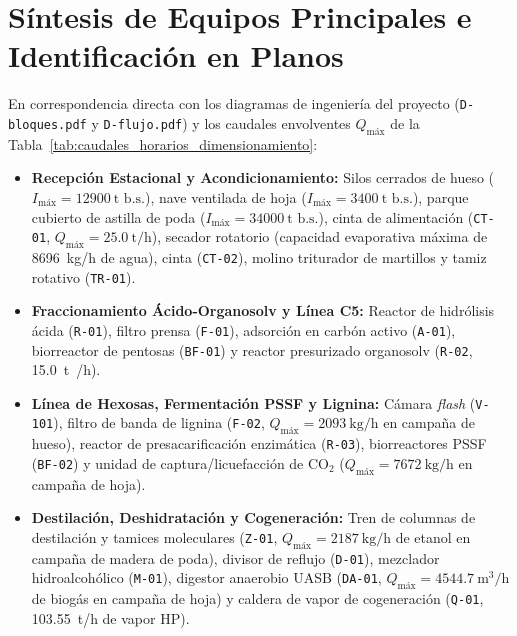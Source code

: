\documentclass{report}
\begin{document}
\section{Síntesis de Equipos Principales e Identificación en Planos}
En correspondencia directa con los diagramas de ingeniería del proyecto (\texttt{D-bloques.pdf} y \texttt{D-flujo.pdf}) y los caudales envolventes $Q_{\text{máx}}$ de la Tabla~\ref{tab:caudales_horarios_dimensionamiento}:
\begin{itemize}
    \item \textbf{Recepción Estacional y Acondicionamiento:} Silos cerrados de hueso ($I_{\text{máx}} = \SI{12900}{\tonne\text{ b.s.}}$), nave ventilada de hoja ($I_{\text{máx}} = \SI{3400}{\tonne\text{ b.s.}}$), parque cubierto de astilla de poda ($I_{\text{máx}} = \SI{34000}{\tonne\text{ b.s.}}$), cinta de alimentación (\texttt{CT-01}, $Q_{\text{máx}} = \SI{25.0}{\tonne/\hour}$), secador rotatorio (capacidad evaporativa máxima de \SI{8696}{\kilo\gram/\hour} de agua), cinta (\texttt{CT-02}), molino triturador de martillos y tamiz rotativo (\texttt{TR-01}).
    \item \textbf{Fraccionamiento Ácido-Organosolv y Línea C5:} Reactor de hidrólisis ácida (\texttt{R-01}), filtro prensa (\texttt{F-01}), adsorción en carbón activo (\texttt{A-01}), biorreactor de pentosas (\texttt{BF-01}) y reactor presurizado organosolv (\texttt{R-02}, \SI{15.0}{\tonne{}/\hour}).
    \item \textbf{Línea de Hexosas, Fermentación PSSF y Lignina:} Cámara \textit{flash} (\texttt{V-101}), filtro de banda de lignina (\texttt{F-02}, $Q_{\text{máx}} = \SI{2093}{\kilo\gram/\hour}$ en campaña de hueso), reactor de presacarificación enzimática (\texttt{R-03}), biorreactores PSSF (\texttt{BF-02}) y unidad de captura/licuefacción de $\text{CO}_2$ ($Q_{\text{máx}} = \SI{7672}{\kilo\gram/\hour}$ en campaña de hoja).
    \item \textbf{Destilación, Deshidratación y Cogeneración:} Tren de columnas de destilación y tamices moleculares (\texttt{Z-01}, $Q_{\text{máx}} = \SI{2187}{\kilo\gram/\hour}$ de etanol en campaña de madera de poda), divisor de reflujo (\texttt{D-01}), mezclador hidroalcohólico (\texttt{M-01}), digestor anaerobio UASB (\texttt{DA-01}, $Q_{\text{máx}} = \SI{4544.7}{\cubic\meter/\hour}$ de biogás en campaña de hoja) y caldera de vapor de cogeneración (\texttt{Q-01}, \SI{103.55}{\tonne/\hour} de vapor HP).
\end{itemize}

\end{document}
